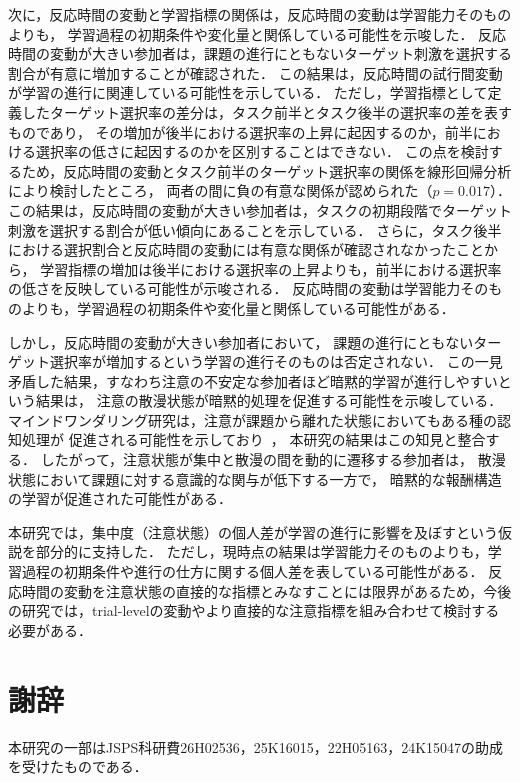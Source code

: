 次に，反応時間の変動と学習指標の関係は，反応時間の変動は学習能力そのものよりも，
学習過程の初期条件や変化量と関係している可能性を示唆した．
反応時間の変動が大きい参加者は，課題の進行にともないターゲット刺激を選択する割合が有意に増加することが確認された．
この結果は，反応時間の試行間変動が学習の進行に関連している可能性を示している．
ただし，学習指標として定義したターゲット選択率の差分は，タスク前半とタスク後半の選択率の差を表すものであり，
その増加が後半における選択率の上昇に起因するのか，前半における選択率の低さに起因するのかを区別することはできない．
この点を検討するため，反応時間の変動とタスク前半のターゲット選択率の関係を線形回帰分析により検討したところ，
両者の間に負の有意な関係が認められた（$p = 0.017$）．
この結果は，反応時間の変動が大きい参加者は，タスクの初期段階でターゲット刺激を選択する割合が低い傾向にあることを示している．
さらに，タスク後半における選択割合と反応時間の変動には有意な関係が確認されなかったことから，
学習指標の増加は後半における選択率の上昇よりも，前半における選択率の低さを反映している可能性が示唆される．
反応時間の変動は学習能力そのものよりも，学習過程の初期条件や変化量と関係している可能性がある．

しかし，反応時間の変動が大きい参加者において，
課題の進行にともないターゲット選択率が増加するという学習の進行そのものは否定されない．
この一見矛盾した結果，すなわち注意の不安定な参加者ほど暗黙的学習が進行しやすいという結果は，
注意の散漫状態が暗黙的処理を促進する可能性を示唆している．
マインドワンダリング研究は，注意が課題から離れた状態においてもある種の認知処理が
促進される可能性を示しており~\cite{simor2025mind,decker2023pay}，
本研究の結果はこの知見と整合する．
したがって，注意状態が集中と散漫の間を動的に遷移する参加者は，
散漫状態において課題に対する意識的な関与が低下する一方で，
暗黙的な報酬構造の学習が促進された可能性がある．

本研究では，集中度（注意状態）の個人差が学習の進行に影響を及ぼすという仮説を部分的に支持した．
ただし，現時点の結果は学習能力そのものよりも，学習過程の初期条件や進行の仕方に関する個人差を表している可能性がある．
反応時間の変動を注意状態の直接的な指標とみなすことには限界があるため，今後の研究では，trial-levelの変動やより直接的な注意指標を組み合わせて検討する必要がある．

\section*{謝辞}
本研究の一部はJSPS科研費26H02536，25K16015，22H05163，24K15047の助成を受けたものである．






